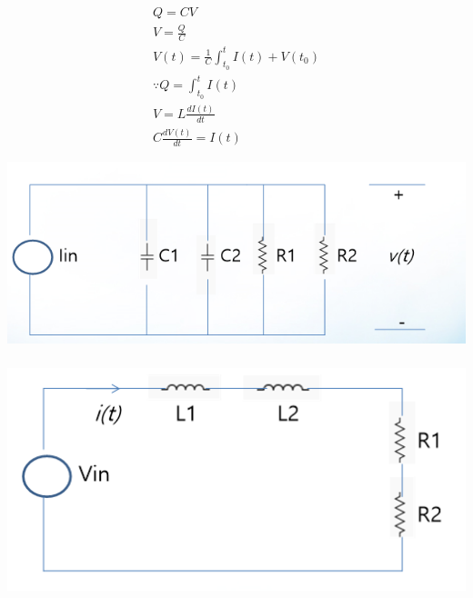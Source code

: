 \documentclass[12pt,a4paper]{article}
\begin{document}
\subsubsection{}
\begin{gather*}
\displaystyle
Q = CV\\
V= \frac{Q}{C}\\
V(t) = \frac{1}{C}\int_{t_0}^{t} I(t) + V(t_0)\\
\because Q = \int_{t_0}^t I(t)\\
V = L\frac{dI(t)}{dt}\\
C\frac{dV(t)}{dt} = I(t) 
\end{gather*}

	\includegraphics[width=\textwidth]{2.png}
	
	
\subsubsection{}
	\includegraphics[width=\textwidth]{3.png}	
	
	
	
	
	
	
\end{document}
